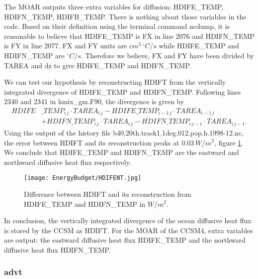 The MOAR outputs three extra variables for diffusion: HDIFE\_TEMP, HDIFN\_TEMP, HDIFB\_TEMP. There is nothing about those variables in the code. Based on their definition using the terminal command ncdump, it is reasonable to believe that HDIFE\_TEMP is FX in line 2076 and HDIFN\_TEMP is FY in line 2077. FX and FY units are $cm^3\,^\circ C/s$ while HDIFE\_TEMP and HDIFN\_TEMP are $^\circ C/s$. Therefore we believe, FX and FY have been divided by TAREA and dz to give HDIFE\_TEMP and HDIFN\_TEMP. 

We can test our hypothesis by reconstructing HDIFT from the vertically integrated divergence of HDIFE\_TEMP and HDIFN\_TEMP. Following lines 2340 and 2341 in hmix\_gm.F90, the divergence is given by 
\begin{align}\label{diveq}
HDIFE&\_TEMP_{i \, j}\cdot  TAREA_{i \, j}- HDIFE\_TEMP_{i-1 \, j}\cdot TAREA_{i-1 \, j} \\
&+ HDIFN\_TEMP_{i \, j}\cdot TAREA_{i \, j} - HDIFN\_TEMP_{i \, j-1}\cdot TAREA_{i \, j-1}.
\end{align}
Using the output of the history file b40.20th.track1.1deg.012.pop.h.1998-12.nc, the error between HDIFT and its reconstruction peaks at $0.03 \, W/m^2$, figure \ref{hdifent}. We conclude that HDIFE\_TEMP and HDIFN\_TEMP are the eastward and northward diffusive heat flux respectively. 

\begin{figure}
\center
\texttt{[image: EnergyBudget/HDIFENT.jpg]}
\caption{Difference between HDIFT and its reconstruction from HDIFE\_TEMP and HDIFN\_TEMP in $W/m^2$.}
\label{hdifent}
\end{figure}

In conclusion, the vertically integrated divergence of the ocean diffusive heat flux is stored by the CCSM as HDIFT. For the MOAR of the CCSM4, extra variables are output: the eastward diffusive heat flux HDIFE\_TEMP and the northward diffusive heat flux HDIFN\_TEMP. 

\subsubsection{advt}

